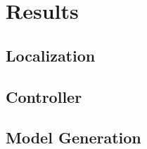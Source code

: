 \chapter{Results\label{ch:results}}

\section{Localization}

\section{Controller}

\section{Model Generation}
